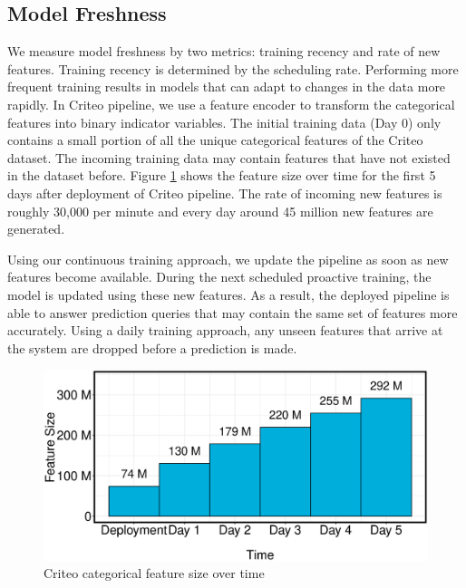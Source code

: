 \subsection{Model Freshness}
We measure model freshness by two metrics: training recency and rate of new features.
Training recency is determined by the scheduling rate.
Performing more frequent training results in models that can adapt to changes in the data more rapidly.
In Criteo pipeline, we use a feature encoder to transform the categorical features into binary indicator variables.
The initial training data (Day 0) only contains a small portion of all the unique categorical features of the Criteo dataset.
The incoming training data may contain features that have not existed in the dataset before.
Figure \ref{fig:criteo-feature-discovery} shows the feature size over time for the first 5 days after deployment of Criteo pipeline.
The rate of incoming new features is roughly 30,000 per minute and every day around 45 million new features are generated.

Using our continuous training approach, we update the pipeline as soon as new features become available.
During the next scheduled proactive training, the model is updated using these new features.
As a result, the deployed pipeline is able to answer prediction queries that may contain the same set of features more accurately.
Using a daily training approach, any unseen features that arrive at the system are dropped before a prediction is made.

\begin{figure}[H]
\includegraphics[width=\columnwidth]{../images/experiment-results/criteo-feature-discovery-experiment.eps}
\caption{Criteo categorical feature size over time}
\label{fig:criteo-feature-discovery}
\end{figure}


